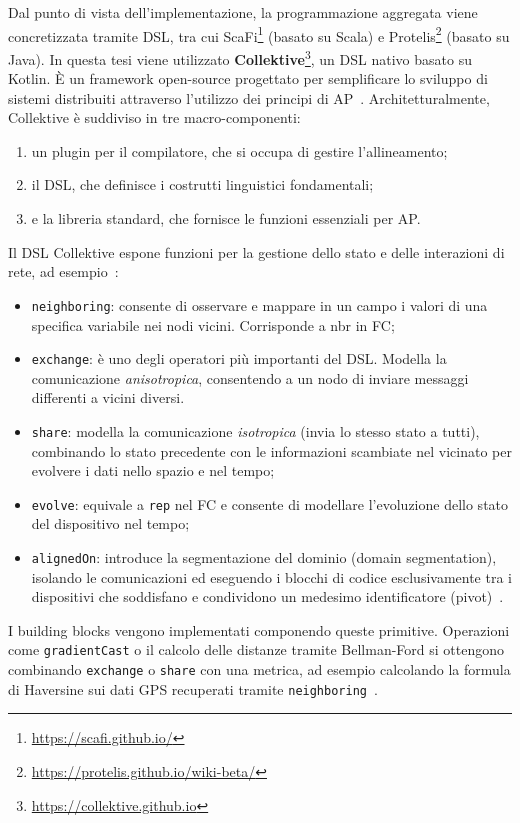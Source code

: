 Dal punto di vista dell'implementazione, la programmazione aggregata viene concretizzata tramite \ac{DSL}, tra cui ScaFi\footnote{\url{https://scafi.github.io/}} (basato su Scala) e Protelis\footnote{\url{https://protelis.github.io/wiki-beta/}} (basato su Java). In questa tesi viene utilizzato \textbf{Collektive}\footnote{\url{https://collektive.github.io}}, un \ac{DSL} nativo basato su Kotlin.
È un framework open-source progettato per semplificare lo sviluppo di sistemi distribuiti attraverso l'utilizzo dei principi di \ac{AP}~\cite{collektiveWeb}.
Architetturalmente, Collektive è suddiviso in tre macro-componenti:
\begin{enumerate}
  \item un plugin per il compilatore, che si occupa di gestire l'allineamento;
  \item il \ac{DSL}, che definisce i costrutti linguistici fondamentali;
  \item e la libreria standard, che fornisce le funzioni essenziali per \ac{AP}.
\end{enumerate}

Il \ac{DSL} Collektive espone funzioni per la gestione dello stato e delle interazioni di rete, ad esempio~\cite{11217861}:
\begin{itemize}
  \item \texttt{neighboring}: consente di osservare e mappare in un campo i valori di una specifica variabile nei nodi vicini. Corrisponde a nbr in \ac{FC};
  \item \texttt{exchange}: è uno degli operatori più importanti del \ac{DSL}. Modella la comunicazione \emph{anisotropica}, consentendo a un nodo di inviare messaggi differenti a vicini diversi.
  \item \texttt{share}: modella la comunicazione \emph{isotropica} (invia lo stesso stato a tutti), combinando lo stato precedente con le informazioni scambiate nel vicinato per evolvere i dati nello spazio e nel tempo;
  \item \texttt{evolve}: equivale a \texttt{rep} nel \ac{FC} e consente di modellare l'evoluzione dello stato del dispositivo nel tempo;
  \item \texttt{alignedOn}: introduce la segmentazione del dominio (domain segmentation), isolando le comunicazioni ed eseguendo i blocchi di codice esclusivamente tra i dispositivi che soddisfano e condividono un medesimo identificatore (pivot)~\cite{11217861}.
\end{itemize}

I building blocks vengono implementati componendo queste primitive. Operazioni come \texttt{gradientCast} o il calcolo delle distanze tramite Bellman-Ford si ottengono combinando \texttt{exchange} o \texttt{share} con una metrica, ad esempio calcolando la formula di Haversine sui dati \ac{GPS} recuperati tramite \texttt{neighboring}~\cite{11217861}.

